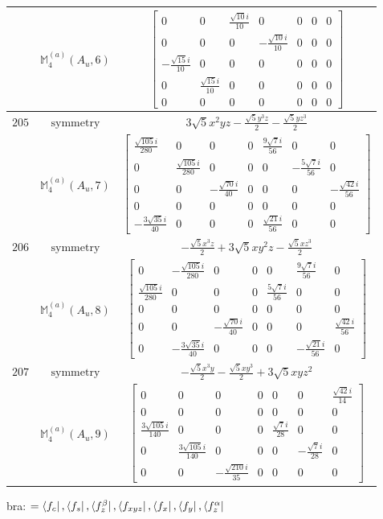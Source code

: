 \documentclass[fleqn,8pt,landscape]{jsarticle}
\begin{document}
\begin{longtable}{ccc}
$  $ & $ \mathbb{M}_{4}^{(a)}(A_{u},6) $ & $ \begin{bmatrix} 0 & 0 & \frac{\sqrt{10} i}{10} & 0 & 0 & 0 & 0 \\ 0 & 0 & 0 & - \frac{\sqrt{10} i}{10} & 0 & 0 & 0 \\ - \frac{\sqrt{15} i}{10} & 0 & 0 & 0 & 0 & 0 & 0 \\ 0 & \frac{\sqrt{15} i}{10} & 0 & 0 & 0 & 0 & 0 \\ 0 & 0 & 0 & 0 & 0 & 0 & 0 \end{bmatrix} $ \\ \hline
$ 205 $ & $ \text{symmetry} $ & $ 3 \sqrt{5} x^{2} y z - \frac{\sqrt{5} y^{3} z}{2} - \frac{\sqrt{5} y z^{3}}{2} $ \\
$  $ & $ \mathbb{M}_{4}^{(a)}(A_{u},7) $ & $ \begin{bmatrix} \frac{\sqrt{105} i}{280} & 0 & 0 & 0 & \frac{9 \sqrt{7} i}{56} & 0 & 0 \\ 0 & \frac{\sqrt{105} i}{280} & 0 & 0 & 0 & - \frac{5 \sqrt{7} i}{56} & 0 \\ 0 & 0 & - \frac{\sqrt{70} i}{40} & 0 & 0 & 0 & - \frac{\sqrt{42} i}{56} \\ 0 & 0 & 0 & 0 & 0 & 0 & 0 \\ - \frac{3 \sqrt{35} i}{40} & 0 & 0 & 0 & \frac{\sqrt{21} i}{56} & 0 & 0 \end{bmatrix} $ \\ \hline
$ 206 $ & $ \text{symmetry} $ & $ - \frac{\sqrt{5} x^{3} z}{2} + 3 \sqrt{5} x y^{2} z - \frac{\sqrt{5} x z^{3}}{2} $ \\
$  $ & $ \mathbb{M}_{4}^{(a)}(A_{u},8) $ & $ \begin{bmatrix} 0 & - \frac{\sqrt{105} i}{280} & 0 & 0 & 0 & \frac{9 \sqrt{7} i}{56} & 0 \\ \frac{\sqrt{105} i}{280} & 0 & 0 & 0 & \frac{5 \sqrt{7} i}{56} & 0 & 0 \\ 0 & 0 & 0 & 0 & 0 & 0 & 0 \\ 0 & 0 & - \frac{\sqrt{70} i}{40} & 0 & 0 & 0 & \frac{\sqrt{42} i}{56} \\ 0 & - \frac{3 \sqrt{35} i}{40} & 0 & 0 & 0 & - \frac{\sqrt{21} i}{56} & 0 \end{bmatrix} $ \\ \hline
$ 207 $ & $ \text{symmetry} $ & $ - \frac{\sqrt{5} x^{3} y}{2} - \frac{\sqrt{5} x y^{3}}{2} + 3 \sqrt{5} x y z^{2} $ \\
$  $ & $ \mathbb{M}_{4}^{(a)}(A_{u},9) $ & $ \begin{bmatrix} 0 & 0 & 0 & 0 & 0 & 0 & \frac{\sqrt{42} i}{14} \\ 0 & 0 & 0 & 0 & 0 & 0 & 0 \\ \frac{3 \sqrt{105} i}{140} & 0 & 0 & 0 & \frac{\sqrt{7} i}{28} & 0 & 0 \\ 0 & \frac{3 \sqrt{105} i}{140} & 0 & 0 & 0 & - \frac{\sqrt{7} i}{28} & 0 \\ 0 & 0 & - \frac{\sqrt{210} i}{35} & 0 & 0 & 0 & 0 \end{bmatrix} $ \\ \hline
\end{longtable}
bra: $=\bra{f_{c}}, \bra{f_{s}}, \bra{f_{z}^{\beta}}, \bra{f_{xyz}}, \bra{f_{x}}, \bra{f_{y}}, \bra{f_{z}^{\alpha}}$
\end{document}
